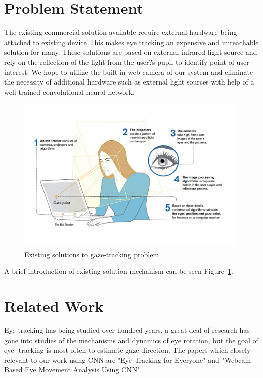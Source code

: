 \documentclass[10pt,twocolumn,letterpaper]{article}
\begin{document}
\section{Problem Statement}
The existing commercial solution available require external hardware
being attached to existing device\cite{eyetrackerlist}\cite{tobii_1} This makes eye tracking an
expensive and unreachable solution for many. These solutions are based
on external infrared light source and rely on the reflection of the
light from the user?s pupil to identify point of user interest. We hope to
utilize the built in web camera of our system and eliminate the necessity
of additional hardware such as external light sources with help of a
well trained convolutional neural network.

\begin{figure}
  \begin{center}
    \includegraphics[width=\linewidth]{existing_solutions}
  \end{center}
  \caption{Existing solutions to gaze-tracking problem}
  \label{fig:existsol}
  \end{figure}

A brief introduction of existing solution mechanism can be seen Figure~\ref{fig:existsol}.
\section{Related Work}
Eye tracking has being studied over hundred years, a great deal of research has gone into studies of the mechanisms and dynamics of eye rotation, but the goal of eye- tracking is most often to estimate gaze direction.  The papers which closely relevant to our work using CNN are "Eye Tracking for Everyone"\cite{krafka} and "Webcam-Based Eye Movement Analysis Using CNN"\cite{zhaomeng}.
\end{document}
